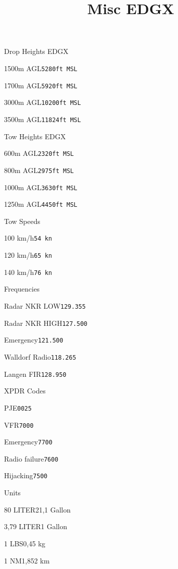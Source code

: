 \documentclass[10pt]{article}
\begin{document}
\title{Misc EDGX}

\begin{checklist}{Drop Heights EDGX}
    \item{1500m AGL}{\texttt{5280ft MSL}}
    \item{1700m AGL}{\texttt{5920ft MSL}}
    \item{3000m AGL}{\texttt{10200ft MSL}}
    \item{3500m AGL}{\texttt{11824ft MSL}}
  \end{checklist}

\begin{checklist}{Tow Heights EDGX}
    \item{600m AGL}{\texttt{2320ft MSL}}
    \item{800m AGL}{\texttt{2975ft MSL}}
    \item{1000m AGL}{\texttt{3630ft MSL}}
    \item{1250m AGL}{\texttt{4450ft MSL}}
  \end{checklist}
  
  \begin{checklist}{Tow Speeds}
    \item{100 km/h}{\texttt{54 kn}}
    \item{120 km/h}{\texttt{65 kn}}
    \item{140 km/h}{\texttt{76 kn}}
  \end{checklist}
  
  \begin{checklist}{Frequencies}
    \item{Radar NKR LOW}{\texttt{129.355}}
    \item{Radar NKR HIGH}{\texttt{127.500}}
    \item{Emergency}{\texttt{121.500}}
    \item{Walldorf Radio}{\texttt{118.265}}
    \item{Langen FIR}{\texttt{128.950}}
  \end{checklist}
  
  \begin{checklist}{XPDR Codes}
    \item{PJE}{\texttt{0025}}
    \item{VFR}{\texttt{7000}}
    \item{Emergency}{\texttt{7700}}
    \item{Radio failure}{\texttt{7600}}
    \item{Hijacking}{\texttt{7500}}
  \end{checklist}
  
  \begin{checklist}{Units}
    \item{80 LITER}{21,1 Gallon}
    \item{3,79 LITER}{1 Gallon}
    \item{1 LBS}{0,45 kg}
    \item{1 NM}{1,852 km}
  \end{checklist}
\end{document}
